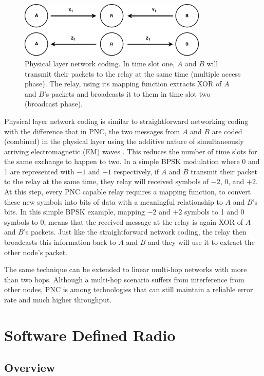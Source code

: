 \begin{figure} [th]
    \centering
    \includegraphics[width=0.8\textwidth]{figures/threeNodePnc.pdf}
    \caption{Physical layer network coding. In time slot one, $A$ and $B$ will transmit their packets to the relay at the same time (multiple access phase). The relay, using its mapping function extracts XOR of $A$ and $B$'s packets and broadcasts it to them in time slot two (broadcast phase).} \label{fig:threeNodePnc}
\end{figure}

Physical layer network coding is similar to straightforward networking coding with the difference that in PNC, the two messages from $A$ and $B$ are coded (combined) in the physical layer using the additive nature of simultaneously arriving electromagnetic (EM) waves \cite{zhang2006hot}. This reduces the number of time slots for the same exchange to happen to two. In a simple BPSK modulation where 0 and 1 are represented with $-1$ and $+1$ respectively, if $A$ and $B$ transmit their packet to the relay at the same time, they relay will received symbols of $-2$, $0$, and $+2$. At this step, every PNC capable relay requires a mapping function, to convert these new symbols into bits of data with a meaningful relationship to $A$ and $B$'s bits. In this simple BPSK example, mapping $-2$ and $+2$ symbols to 1 and $0$ symbols to 0, means that the received message at the relay is again XOR of $A$ and $B$'s packets. Just like the straightforward network coding, the relay then broadcasts this information back to $A$ and $B$ and they will use it to extract the other node's packet.

The same technique can be extended to linear multi-hop networks with more than two hops. Although a multi-hop scenario suffers from interference from other nodes, PNC is among technologies that can still maintain a reliable error rate and much higher throughput.


\section{Software Defined Radio}

\subsection{Overview}

